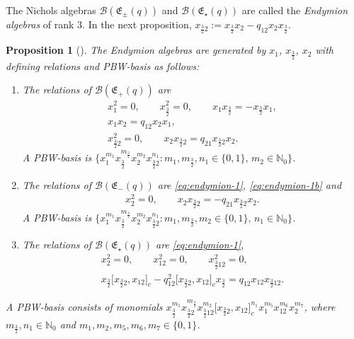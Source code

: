 \documentclass[pdftex]{sigma}
\numberwithin{equation}{section}
\newtheorem{Proposition}[Theorem]{Proposition}
 { \theoremstyle{definition}
\newtheorem{Definition}[Theorem]{Definition}
\newtheorem{Note}[Theorem]{Note}
\newtheorem{Example}[Theorem]{Example}
\newtheorem{Remark}[Theorem]{Remark} }
\newcommand{\toba}{\mathscr B}
\newcommand{\N}{{\mathbb N}}
\newcommand{\eny}{\mathfrak{E}}
\newcommand{\tresdos}{\frac{3}{2}}
\begin{document}
The Nichols algebras $\toba(\eny_{\pm}(q))$ and $\toba(\eny_{\star}(q))$ are called the \emph{Endymion algebras} of rank 3.
In the next proposition, $x_{\tresdos2} := x_{\tresdos}x_2 - q _{12} x_2x_{\tresdos}$.

\begin{Proposition}[{\cite[Propositions 8.1.6, 8.1.7 and 8.1.8]{AAH-triang}}]\label{prop:paleblocks}
The Endymion algebras are generated by $x_1$, $x_{\tresdos}$, $x_2$ with defining relations and PBW-basis as follows:
\begin{enumerate}[label=$(\alph*)$]\itemsep=0pt
\item The relations of $\toba(\eny_+(q))$ are
\begin{gather}\label{eq:endymion-1}
x_1^2=0, \qquad x_{\tresdos}^2=0,\qquad x_1x_{\tresdos} =- x_{\tresdos}x_1,
\\
\label{eq:endymion-1b}
x_1x_2 = q_{12} x_2x_1,
\\
\label{eq:endymion-2}
x_{\tresdos2}^2=0,\qquad
 x_2x_{\tresdos2} = q_{21}x_{\tresdos2} x_2.
\end{gather}
A PBW-basis is
$\big\{ x_1^{m_1} x_{\tresdos}^{m_{\tresdos}} x_2^{m_2}x_{\tresdos2}^{n_{1}}\colon m_1, m_{\tresdos}, n_1 \in \{0,1\}, \, m_2 \in\N_0\big\}$.

\item
The relations of $\toba(\eny_-(q))$ are \eqref{eq:endymion-1}, \eqref{eq:endymion-1b} and
\begin{gather}
\label{eq:endymion-2b}
x_2 ^2=0,\qquad
x_2 x_{\tresdos2} = -q_{21} x_{\tresdos2} x_2.
\end{gather}
A PBW-basis is
$\big\{ x_1^{m_1} x_{\tresdos}^{m_{\tresdos}} x_2^{m_2}x_{\tresdos2}^{n_{1}}\colon m_1, m_{\tresdos}, m_2 \in \{0,1\}, \, n_{1} \in\N_0\big\}$.

\item
The relations of $\toba(\eny_{\star}(q))$ are \eqref{eq:endymion-1},
\begin{gather*}%
x_2^2=0, \qquad x_{12}^2=0, \qquad x_{\tresdos12}^2=0,
\\
x_{\tresdos} \big[x_{\tresdos2},x_{12}\big]_c- q_{12}^2 \big[x_{\tresdos2},x_{12}\big]_c x_{\tresdos}
=q_{12} x_{12}x_{\tresdos12}.
\end{gather*}
\end{enumerate}

A PBW-basis consists of monomials
$x_{\tresdos}^{m_1}x_{\tresdos2}^{m_{\tresdos}} x_{\tresdos12}^{m_2} \big[x_{\tresdos2},x_{12}\big]_c^{n_{1}} x_1^{m_5}x_{12}^{m_6} x_2^{m_7}$,
where $m_{\tresdos}, n_{1} \in\N_0$ and $m_1, m_2, m_5, m_6, m_7 \in \{0,1\}$.
\end{Proposition}
\end{document}
